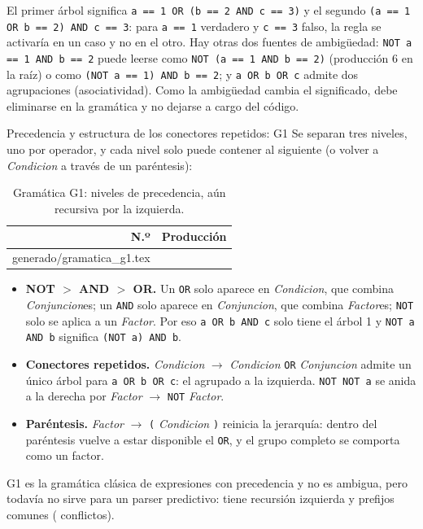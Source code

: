 \documentclass[11pt,letterpaper]{article}
\makeatletter
\renewcommand\subsection{\@startsection{subsection}{2}{\z@}{-2.6ex\@plus -1ex \@minus -.2ex}{1.0ex \@plus .2ex}%
  {\normalfont\large\bfseries}}
\newcommand{\filas}[1]{\@@input #1 }
\newcommand{\T}[1]{\texttt{#1}}
\newcommand{\NT}[1]{\textit{#1}}
\newcommand{\cabeza}{\rowcolor{cabecera}}
\makeatother
\begin{document}
El primer árbol significa \T{a == 1 OR (b == 2 AND c == 3)} y el segundo \T{(a == 1 OR b == 2) AND c == 3}:
para \T{a == 1} verdadero y \T{c == 3} falso, la regla se activaría en un caso y no en el otro. Hay otras dos
fuentes de ambigüedad: \T{NOT a == 1 AND b == 2} puede leerse como \T{NOT (a == 1 AND b == 2)} (producción 6
en la raíz) o como \T{(NOT a == 1) AND b == 2}; y \T{a OR b OR c} admite dos agrupaciones (asociatividad). Como
la ambigüedad cambia el significado, debe eliminarse en la gramática y no dejarse a cargo del código.

\subsection{Precedencia y estructura de los conectores repetidos: G1}
Se separan tres niveles, uno por operador, y cada nivel solo puede contener al siguiente (o volver a
\NT{Condicion} a través de un paréntesis):

\begin{longtable}{r>{\raggedright\arraybackslash}p{13.8cm}}
\caption{Gramática G1: niveles de precedencia, aún recursiva por la izquierda.}\label{tab:g1}\\
\hline\cabeza \textbf{N.º} & \textbf{Producción}\\\hline\endfirsthead
\filas{generado/gramatica_g1.tex}
\hline
\end{longtable}

\begin{itemize}
\item \textbf{NOT $>$ AND $>$ OR.} Un \T{OR} solo aparece en \NT{Condicion}, que combina \NT{Conjuncion}es; un
\T{AND} solo aparece en \NT{Conjuncion}, que combina \NT{Factor}es; \T{NOT} solo se aplica a un \NT{Factor}.
Por eso \T{a OR b AND c} solo tiene el árbol 1 y \T{NOT a AND b} significa \T{(NOT a) AND b}.
\item \textbf{Conectores repetidos.} \NT{Condicion} $\to$ \NT{Condicion} \T{OR} \NT{Conjuncion} admite un único
árbol para \T{a OR b OR c}: el agrupado a la izquierda. \T{NOT NOT a} se anida a la derecha por
\NT{Factor} $\to$ \T{NOT} \NT{Factor}.
\item \textbf{Paréntesis.} \NT{Factor} $\to$ \T{(} \NT{Condicion} \T{)} reinicia la jerarquía: dentro del
paréntesis vuelve a estar disponible el \T{OR}, y el grupo completo se comporta como un factor.
\end{itemize}
G1 es la gramática clásica de expresiones con precedencia y no es ambigua, pero todavía no sirve para un
parser predictivo: tiene recursión izquierda y prefijos comunes (\NumConflictosGuno{} conflictos).
\end{document}
